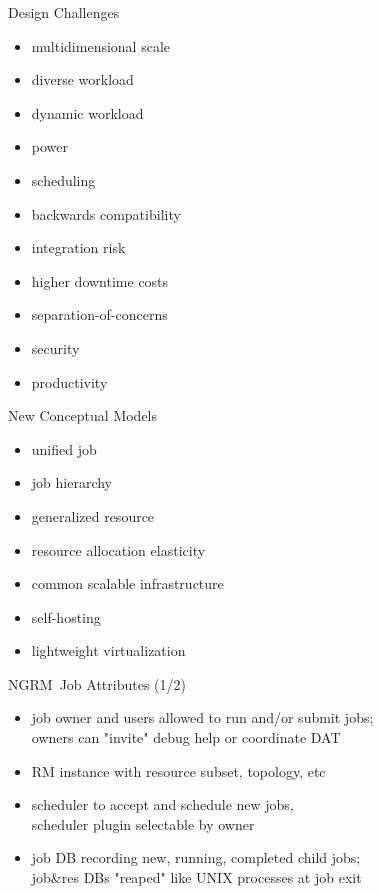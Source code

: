 \documentclass[default,pdf,colorBG,slideColor]{prosper}
\newcommand{\ngrm}{NGRM}
\begin{document}
\begin{slide}{Design Challenges}{\small
\begin{minipage}{0.47\textwidth}
\begin{itemize}
  \item{multidimensional scale}
  \item{diverse workload}
  \item{dynamic workload}
  \item{power}
  \item{scheduling}
\end{itemize}
\end{minipage}
\begin{minipage}{0.47\textwidth}
\begin{itemize}
  \item{backwards compatibility}
  \item{integration risk}
  \item{higher downtime costs}
  \item{separation-of-concerns}
  \item{security}
  \item{productivity}
\end{itemize}
\end{minipage}
}\end{slide}
\begin{slide}{New Conceptual Models}{\small
\begin{itemize}
  \item{unified job}
  \item{job hierarchy}
  \item{generalized resource}
  \item{resource allocation elasticity}
  \item{common scalable infrastructure}
  \item{self-hosting}
  \item{lightweight virtualization}
\end{itemize}
}\end{slide}
\begin{slide}{\ngrm\ Job Attributes (1/2)}{\small
\begin{itemize}
  \item{job owner and users allowed to run and/or submit jobs;\\
	owners can "invite" debug help or coordinate DAT}
  \item{RM instance with resource subset, topology, etc}
  \item{scheduler to accept and schedule new jobs,\\
	scheduler plugin selectable by owner}
  \item{job DB recording new, running, completed child jobs;\\
	job\&res DBs "reaped" like UNIX processes at job exit}
\end{itemize}
}\end{slide}
\end{document}

